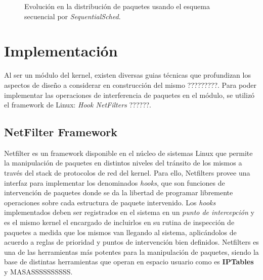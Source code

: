 \begin{figure}[th!]
\centering
{}
\caption{Evolución en la distribución de paquetes usando el esquema secuencial por \emph{SequentialSched}.}
\label{fig:SequentialSched}
\end{figure}

\section{Implementación}
Al ser un módulo del kernel, existen diversas guias técnicas que profundizan los aspectos de diseño a considerar en construcción del mismo ?????????. Para poder implementar las operaciones de interferencia de paquetes en el módulo, se utilizó el framework de Linux: \emph{Hook NetFilters} ??????.

\subsection{NetFilter Framework}
Netfilter es un framework disponible en el núcleo de sistemas Linux que permite la manipulación de paquetes en distintos niveles del tránsito de los mismos a través del stack de protocolos de red del kernel. Para ello, Netfilters provee una interfaz para implementar los denominados \emph{hooks}, que son funciones de intervención de paquetes donde se da la libertad de programar libremente operaciones sobre cada estructura de paquete intervenido. Los \emph{hooks} implementados deben ser registrados en el sistema en un \emph{punto de intercepción} y es el mismo kernel el encargado de incluirlos en su rutina de inspección de paquetes a medida que los mismos van llegando al sistema, aplicándolos de acuerdo a reglas de prioridad y puntos de intervención bien definidos. Netfilters es una de las herramientas más potentes para la manipulación de paquetes, siendo la base de distintas herramientas que operan en espacio usuario como es \textbf{IPTables} y MASASSSSSSSSSS.

